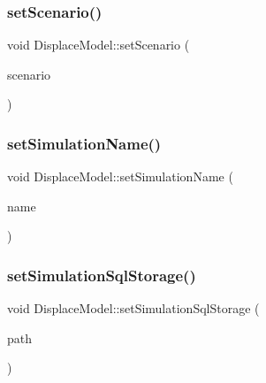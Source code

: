 \mbox{\label{class_displace_model_a83a43265a9b032811b090058e938792c}} 
\subsubsection{\texorpdfstring{setScenario()}{setScenario()}}
{\footnotesize\ttfamily void Displace\+Model\+::set\+Scenario (\begin{DoxyParamCaption}\item[{const \mbox{\hyperlink{class_scenario}{Scenario}} \&}]{scenario }\end{DoxyParamCaption})}

\mbox{\label{class_displace_model_acbf07beebc94de38d6408d5911c78a5c}} 
\subsubsection{\texorpdfstring{setSimulationName()}{setSimulationName()}}
{\footnotesize\ttfamily void Displace\+Model\+::set\+Simulation\+Name (\begin{DoxyParamCaption}\item[{const Q\+String \&}]{name }\end{DoxyParamCaption})\hspace{0.3cm}{\ttfamily [inline]}}

\mbox{\label{class_displace_model_a8a6589d9bf211415457b337d920e09d3}} 
\subsubsection{\texorpdfstring{setSimulationSqlStorage()}{setSimulationSqlStorage()}}
{\footnotesize\ttfamily void Displace\+Model\+::set\+Simulation\+Sql\+Storage (\begin{DoxyParamCaption}\item[{const Q\+String \&}]{path }\end{DoxyParamCaption})}

